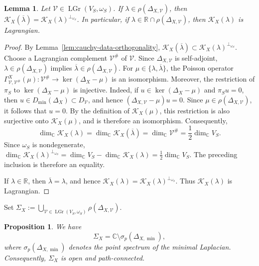 \documentclass[12pt]{amsart}
\theoremstyle{plain}
\newtheorem{lem}[thm]{Lemma}
\newtheorem{prop}[thm]{Proposition}
\theoremstyle{definition}
\theoremstyle{remark}
\numberwithin{equation}{section} \numberwithin{figure}{section}
\renewcommand*{\to}{\rightarrow}
\newcommand{\mb}[1]{\mathbb{#1}} %
\newcommand{\mc}[1]{\mathcal{#1}}
\begin{document}
\begin{lem}\label{lem:cauchy-data-orthogonal-complement}
Let \(\mc V\in\operatorname{LGr}(V_S,\omega_S)\). If
\(\lambda\in\rho(\Delta_{X,\mc V})\), then
\(\mc K_X(\overline{\lambda})
=\mc K_X(\lambda)^{\perp_{\omega_S}}\).
In particular, if
\(\lambda\in\mb R\cap\rho(\Delta_{X,\mc V})\), then
\(\mc K_X(\lambda)\) is Lagrangian.
\end{lem}
\begin{proof}
By Lemma~\ref{lem:cauchy-data-orthogonality},
\(\mc K_X(\overline{\lambda})
\subset\mc K_X(\lambda)^{\perp_{\omega_S}}\).
Choose a Lagrangian complement \(\mc V^\#\) of \(\mc V\). Since
\(\Delta_{X,\mc V}\) is self-adjoint,
\(\lambda\in\rho(\Delta_{X,\mc V})\) implies
\(\overline{\lambda}\in\rho(\Delta_{X,\mc V})\). For
\(\mu\in\{\lambda,\overline{\lambda}\}\), the Poisson operator
\(\Gamma_{\mc V,\mc V^\#}^X(\mu):
\mc V^\#\to\ker(\Delta_X-\mu)\)
is an isomorphism.
Moreover, the restriction of \(\pi_S\) to
\(\ker(\Delta_X-\mu)\) is injective. Indeed, if
\(u\in\ker(\Delta_X-\mu)\) and \(\pi_Su=0\), then
\(u\in D_{\min}(\Delta_X)\subset D_{\mc V}\), and hence
\((\Delta_{X,\mc V}-\mu)u=0\). Since
\(\mu\in\rho(\Delta_{X,\mc V})\), it follows that \(u=0\).
By the definition of \(\mc K_X(\mu)\), this restriction is also
surjective onto \(\mc K_X(\mu)\), and is therefore an isomorphism.
Consequently,
\[
\dim_{\mb C}\mc K_X(\lambda)
=
\dim_{\mb C}\mc K_X(\overline{\lambda})
=
\dim_{\mb C}\mc V^\#
=
\frac12\dim_{\mb C}V_S.
\]
Since \(\omega_S\) is nondegenerate,
\(\dim_{\mb C}\mc K_X(\lambda)^{\perp_{\omega_S}}
=\dim_{\mb C}V_S-\dim_{\mb C}\mc K_X(\lambda)
=\frac12\dim_{\mb C}V_S\).
The preceding inclusion is therefore an equality.

If \(\lambda\in\mb R\), then
\(\overline{\lambda}=\lambda\), and hence
\(\mc K_X(\lambda)
=\mc K_X(\lambda)^{\perp_{\omega_S}}\).
Thus \(\mc K_X(\lambda)\) is Lagrangian.
\end{proof}

Set
\(
    \Sigma_X
    :=
    \bigcup_{\mc V\in\operatorname{LGr}(V_S,\omega_S)}
    \rho(\Delta_{X,\mc V}).
\)

\begin{prop}\label{prop:domain-of-cauchy-data-map}
We have
\[
    \Sigma_X
    =
    \mb C\setminus\sigma_p(\Delta_{X,\min}),
\]
where \(\sigma_p(\Delta_{X,\min})\) denotes the point spectrum of the
minimal Laplacian. Consequently, \(\Sigma_X\) is open and
path-connected.
\end{prop}
\end{document}
